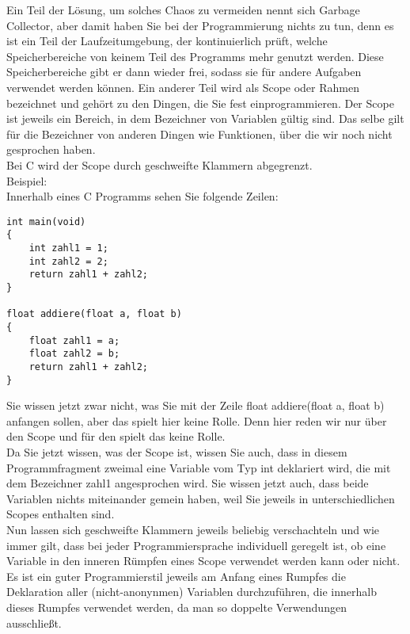 Ein Teil der Lösung, um solches Chaos zu vermeiden nennt sich Garbage Collector, aber damit haben Sie bei der Programmierung nichts zu tun, denn es ist ein Teil der Laufzeitumgebung, der kontinuierlich prüft, welche Speicherbereiche von keinem Teil des Programms mehr genutzt werden. Diese Speicherbereiche gibt er dann wieder frei, sodass sie für andere Aufgaben verwendet werden können. Ein anderer Teil wird als Scope oder Rahmen bezeichnet und gehört zu den Dingen, die Sie fest einprogrammieren. Der Scope ist jeweils ein Bereich, in dem Bezeichner von Variablen gültig sind. Das selbe gilt für die Bezeichner von anderen Dingen wie Funktionen, über die wir noch nicht gesprochen haben.\\

Bei C wird der Scope durch geschweifte Klammern abgegrenzt.\\

Beispiel:\\

Innerhalb eines C Programms sehen Sie folgende Zeilen:\\

\begin{verbatim}
int main(void)
{
	int zahl1 = 1;
	int zahl2 = 2;
	return zahl1 + zahl2;
}

float addiere(float a, float b)
{
	float zahl1 = a;
	float zahl2 = b;
	return zahl1 + zahl2;
}
\end{verbatim}

Sie wissen jetzt zwar nicht, was Sie mit der Zeile float addiere(float a, float b) anfangen sollen, aber das spielt hier keine Rolle. Denn hier reden wir nur über den Scope und für den spielt das keine Rolle.\\

Da Sie jetzt wissen, was der Scope ist, wissen Sie auch, dass in diesem Programmfragment zweimal eine Variable vom Typ int deklariert wird, die mit dem Bezeichner zahl1 angesprochen wird. Sie wissen jetzt auch, dass beide Variablen nichts miteinander gemein haben, weil Sie jeweils in unterschiedlichen Scopes enthalten sind.\\

Nun lassen sich geschweifte Klammern jeweils beliebig verschachteln und wie immer gilt, dass bei jeder Programmiersprache individuell geregelt ist, ob eine Variable in den inneren Rümpfen eines Scope verwendet werden kann oder nicht.\\

Es ist ein guter Programmierstil jeweils am Anfang eines Rumpfes die Deklaration aller (nicht-anonynmen) Variablen durchzuführen, die innerhalb dieses Rumpfes verwendet werden, da man so doppelte Verwendungen ausschließt. \\


